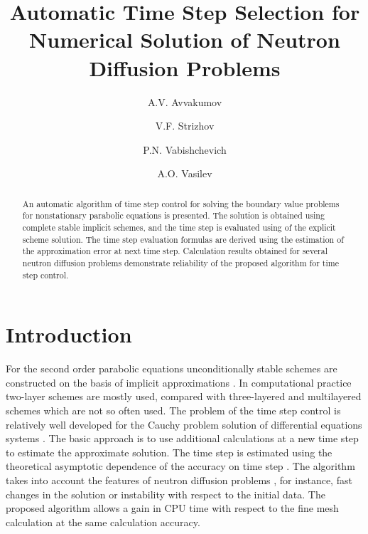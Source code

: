 \documentclass[runningheads]{llncs}
\begin{document}
%
\title{Automatic Time Step Selection for Numerical Solution of Neutron Diffusion Problems}
%
%
\author{A.V. Avvakumov \and
V.F. Strizhov\and
P.N. Vabishchevich\and
A.O. Vasilev}
%
%
%
\maketitle              %
%
\begin{abstract}
An automatic algorithm of time step control for solving the boundary value problems for nonstationary parabolic equations is presented.
The solution is obtained using complete stable implicit schemes, and the time step is evaluated using of the explicit scheme solution.
The time step evaluation formulas are derived using the estimation of the approximation error at next time step.
Calculation results obtained for several neutron diffusion problems demonstrate reliability of the proposed algorithm for time step control. 

\end{abstract}

\section{Introduction}
For the second order parabolic equations unconditionally stable schemes are constructed on the basis of implicit approximations \cite{Matus}.
In computational practice two-layer schemes are mostly used, compared with three-layered and multilayered schemes which are not so often used.
The problem of the time step control is relatively well developed for the Cauchy problem solution of differential equations systems \cite{Ascher}. 
The basic approach is to use additional calculations at a new time step to estimate the approximate solution.
The time step is estimated using the theoretical asymptotic dependence of the accuracy on time step \cite{Vabishchevich}.
The algorithm takes into account the features of neutron diffusion problems \cite{Lozenets16}, for instance, fast changes in the solution or instability with respect to the initial data. The proposed algorithm allows a gain in CPU time with respect to the fine mesh calculation at the same calculation accuracy.
\end{document}
